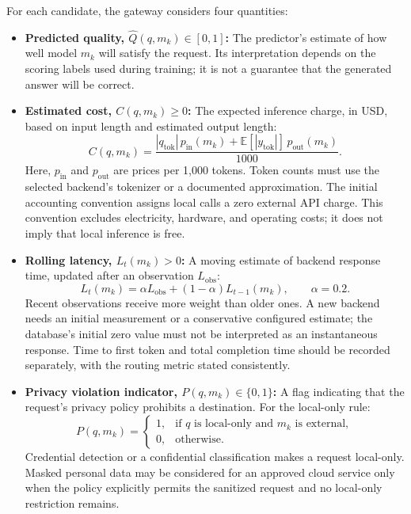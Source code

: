 For each candidate, the gateway considers four quantities:
\begin{itemize}
    \item \textbf{Predicted quality, $\hat{Q}(q,m_k)\in[0,1]$:} The predictor's estimate of how well model $m_k$ will satisfy the request. Its interpretation depends on the scoring labels used during training; it is not a guarantee that the generated answer will be correct.
    \item \textbf{Estimated cost, $C(q,m_k)\geq0$:} The expected inference charge, in USD, based on input length and estimated output length:
    \begin{equation}
    C(q,m_k)=\frac{|q_{\mathrm{tok}}|\,p_{\mathrm{in}}(m_k)
    +\mathbb{E}[|y_{\mathrm{tok}}|]\,p_{\mathrm{out}}(m_k)}{1000}.
    \end{equation}
    Here, $p_{\mathrm{in}}$ and $p_{\mathrm{out}}$ are prices per 1,000 tokens. Token counts must use the selected backend's tokenizer or a documented approximation. The initial accounting convention assigns local calls a zero external API charge. This convention excludes electricity, hardware, and operating costs; it does not imply that local inference is free.
    \item \textbf{Rolling latency, $L_t(m_k)>0$:} A moving estimate of backend response time, updated after an observation $L_{\mathrm{obs}}$:
    \begin{equation}
    L_t(m_k)=\alpha L_{\mathrm{obs}}+(1-\alpha)L_{t-1}(m_k),
    \qquad \alpha=0.2.
    \end{equation}
    Recent observations receive more weight than older ones. A new backend needs an initial measurement or a conservative configured estimate; the database's initial zero value must not be interpreted as an instantaneous response. Time to first token and total completion time should be recorded separately, with the routing metric stated consistently.
    \item \textbf{Privacy violation indicator, $P(q,m_k)\in\{0,1\}$:} A flag indicating that the request's privacy policy prohibits a destination. For the local-only rule:
    \begin{equation}
    P(q,m_k)=
    \begin{cases}
    1, & \text{if }q\text{ is local-only and }m_k\text{ is external},\\
    0, & \text{otherwise}.
    \end{cases}
    \end{equation}
    Credential detection or a confidential classification makes a request local-only. Masked personal data may be considered for an approved cloud service only when the policy explicitly permits the sanitized request and no local-only restriction remains.
\end{itemize}

